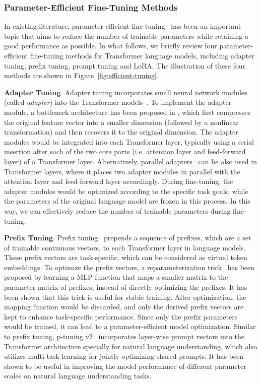 \subsubsection{Parameter-Efficient Fine-Tuning Methods}\label{sec-PEFT-methods}
In existing literature, parameter-efficient fine-tuning~\cite{Li-ACL-2021-prefix,Lester-ACL-2021-The,Hu-ICLR-2022-LoRA} has been an important topic that aims to reduce the number of trainable parameters while retaining a good performance as possible. In what follows, we briefly review four  parameter-efficient fine-tuning methods for Transformer language models, including adapter tuning, prefix tuning, prompt tuning and LoRA. The illustration of these four methods are shown in Figure~\ref{fig:efficient-tuning}.

\textbf{Adapter  Tuning}. Adapter tuning  incorporates small neural network modules (called \emph{adapter}) into the Transformer models~\cite{Houlsby-ICML-2019-Parameter}. To implement  the adapter module, a bottleneck architecture has been proposed in \cite{Houlsby-ICML-2019-Parameter,Hu-arXiv-2023}, which first compresses the original feature vector into a smaller dimension (followed by a nonlinear transformation) and then recovers it to the original dimension. The adapter modules would be integrated into each Transformer layer, typically using a serial insertion after each of the two core parts (i.e. attention layer and feed-forward layer) of a Transformer layer. Alternatively,  parallel adapters~\cite{He-ICLR-2022-towards} can be also used in Transformer layers, where it places two adapter modules in parallel with the attention layer and feed-forward layer accordingly. During fine-tuning, the adapter modules would be optimized according to the  specific task goals, while the parameters of the original language model are  frozen in this process. In this way, we can effectively reduce the number of trainable parameters during fine-tuning.

\textbf{Prefix Tuning}. Prefix tuning~\cite{Li-ACL-2021-prefix} prepends a sequence of prefixes, which are a set of trainable continuous vectors,  to each Transformer layer in language models.  These prefix vectors are task-specific,  which can be considered as virtual token embeddings. To optimize the prefix vectors, a reparameterization trick~\cite{Li-ACL-2021-prefix} has been proposed by learning a MLP function that maps a smaller matrix to the parameter matrix of prefixes, instead of directly optimizing the prefixes. It has been shown that this trick is useful for stable training. After optimization, the mapping function would be discarded, and only the derived prefix vectors are kept to enhance task-specific performance. Since only the prefix parameters would be trained, it can lead to a  parameter-efficient model optimization. Similar to prefix tuning, p-tuning v2~\cite{Liu-arXiv-2021-P-tuning} incorporates layer-wise prompt vectors into the Transformer architecture specially for natural language understanding, which also utilizes multi-task learning for jointly optimizing shared prompts. It has been shown to be useful in improving the model performance of different  parameter scales  on  natural language understanding tasks. 

